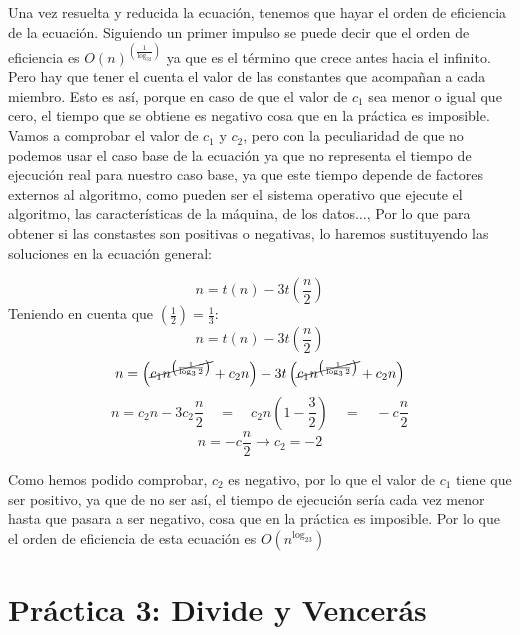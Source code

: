 \documentclass[10pt,a4paper,spanish]{report}
\begin{document}
Una vez resuelta y reducida la ecuación, tenemos que hayar el orden de eficiencia de la ecuación. Siguiendo un primer impulso se puede decir que el orden de eficiencia es $O\left(n\right)^{\left(\frac{1}{\log_32}\right)}$ ya que es el término que crece antes hacia el infinito. Pero hay que tener el cuenta el valor de las constantes que acompañan a cada miembro. Esto es así, porque en caso de que el valor de $c_1$ sea menor o igual que cero, el tiempo que se obtiene es negativo cosa que en la práctica es imposible. Vamos a comprobar el valor de $c_1$ y $c_2$, pero con la peculiaridad de que no podemos usar el caso base de la ecuación ya que no representa el tiempo de ejecución real para nuestro caso base, ya que este tiempo depende de factores externos al algoritmo, como pueden ser el sistema operativo que ejecute el algoritmo, las características de la máquina, de los datos$\ldots$, Por lo que para obtener si las constastes son positivas o negativas, lo haremos sustituyendo las soluciones en la ecuación general:
\begin{center}
\begin{displaymath}
  n = t(n) - 3t\left(\frac{n}{2}\right)
\end{displaymath}
Teniendo en cuenta que $\left(\frac{1}{2}\right) = \frac{1}{3}$:
\begin{displaymath}
  n = t(n) - 3t\left(\frac{n}{2}\right)
\end{displaymath}
\begin{displaymath}
  n = \left(\cancel{c_1n^{\left(\frac{1}{\log_32}\right)}} + c_2n\right) - 3t\left(\cancel{c_1n^{\left(\frac{1}{\log_32}\right)}} + c_2n\right)
\end{displaymath}
\begin{displaymath}
  n = c_2n -3c_2\frac{n}{2} \quad = \quad c_2n\left(1 - \frac{3}{2}\right) \quad = \quad -c\frac{n}{2}
\end{displaymath}
\begin{displaymath}
  n = -c\frac{n}{2} \longrightarrow c_2 = -2
\end{displaymath}
\end{center}

Como hemos podido comprobar, $c_2$ es negativo, por lo que el valor de $c_1$ tiene que ser positivo, ya que de no ser así, el tiempo de ejecución sería cada vez menor hasta que pasara a ser negativo, cosa que en la práctica es imposible. Por lo que el orden de eficiencia de esta ecuación es $O(n^{\log_23})$

\chapter{\textcolor[rgb]{0.1,0.2,1}Práctica 3: \textcolor[rgb]{0.1,0.2,1}Divide y \textcolor[rgb]{0.1,0.2,1}Vencerás}
\end{document}
